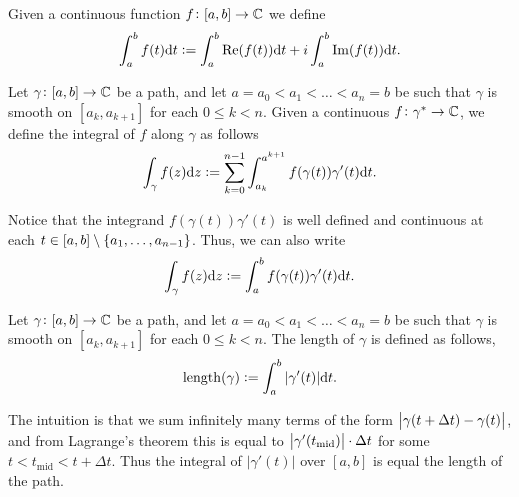 \documentclass[11pt,a4paper]{article}
\begin{document}
\begin{definition}[Integral]
  Given a continuous function $f \colon [a,b] \to \mathbb{C}$ we define
  \[
    \int_{a}^{b} f(t) \mathrm{d} t :=
    \int_{a}^{b} \mathrm{Re}(f(t)) \mathrm{d} t +
    i \int_{a}^{b} \mathrm{Im}(f(t)) \mathrm{d} t.
  \]
\end{definition}

\begin{definition}
  Let $\gamma \colon [a, b] \to \mathbb{C}$ be a path,
  and let $a = a_0 < a_1 < \dots < a_n = b$
  be such that $\gamma$ is smooth on $[a_k, a_{k+1}]$ for each 
  $0 \le k < n$.
  Given a continuous $f \colon \gamma^* \to \mathbb{C}$,
  we define the integral of $f$ along $\gamma$ as follows
  \[
    \int_{\gamma} f(z) \mathrm{d} z :=
    \sum_{k=0}^{n-1} \int_{a_k}^{a^{k+1}} f(\gamma(t)) \gamma'(t) \mathrm{d} t.
  \]
\end{definition}
\begin{remark}
  Notice that the integrand $f(\gamma(t)) \gamma'(t)$ is well defined
  and continuous at each $t \in [a,b] \setminus \left\{a_1,\dots,a_{n-1}\right\}$.
  Thus, we can also write
  \[
    \int_{\gamma} f(z) \mathrm{d} z :=
    \int_{a}^{b} f(\gamma(t)) \gamma'(t) \mathrm{d} t.
  \]
\end{remark}

\begin{definition}
  Let $\gamma \colon [a, b] \to \mathbb{C}$ be a path,
  and let $a = a_0 < a_1 < \dots < a_n = b$
  be such that $\gamma$ is smooth on $[a_k, a_{k+1}]$ for each 
  $0 \le k < n$.
  The length of $\gamma$ is defined as follows,
  \[
    \mathrm{length}(\gamma) := \int_{a}^{b} |\gamma'(t)| \mathrm{d} t.
  \]
\end{definition}
\begin{remark}
  The intuition is that we sum infinitely many terms of the form
  $\left\lvert\gamma(t + \Delta t) - \gamma(t)\right\rvert$,
  and from Lagrange's theorem this is equal to
  $\left\lvert\gamma'(t_{\text{mid}})\right\rvert \cdot \Delta t$
  for some $t < t_{\text{mid}} < t + \Delta t$.
  Thus the integral of $|\gamma'(t)|$ over $[a,b]$ is
  equal the length of the path.
\end{remark}
\end{document}

